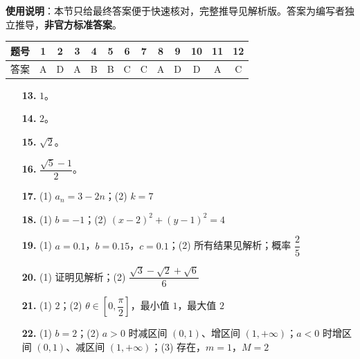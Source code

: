 
\begin{gknotice}
\textbf{使用说明}：本节只给最终答案便于快速核对，完整推导见解析版。答案为编写者独立推导，\textbf{非官方标准答案}。
\end{gknotice}

\begin{center}\begin{tabular}{ccccccccccccc}
\toprule
题号 & 1 & 2 & 3 & 4 & 5 & 6 & 7 & 8 & 9 & 10 & 11 & 12 \\
\midrule
答案 & A & D & A & B & B & C & C & A & D & D & A & C \\
\bottomrule
\end{tabular}\end{center}

\begin{itemize}[leftmargin=2.6em]
  \item[\textbf{13.}] $1$。
  \item[\textbf{14.}] $2$。
  \item[\textbf{15.}] $\sqrt2$。
  \item[\textbf{16.}] $\dfrac{\sqrt5-1}2$。
\end{itemize}

\begin{itemize}[leftmargin=2.6em]
  \item[\textbf{17.}] (1) $a_n=3-2n$；(2) $k=7$
  \item[\textbf{18.}] (1) $b=-1$；(2) $(x-2)^2+(y-1)^2=4$
  \item[\textbf{19.}] (1) $a=0.1$，$b=0.15$，$c=0.1$；(2) 所有结果见解析；概率 $\dfrac25$
  \item[\textbf{20.}] (1) 证明见解析；(2) $\dfrac{\sqrt3-\sqrt2+\sqrt6}6$
  \item[\textbf{21.}] (1) $2$；(2) $\theta\in\left[0,\dfrac\pi2\right]$，最小值 $1$，最大值 $2$
  \item[\textbf{22.}] (1) $b=2$；(2) $a>0$ 时减区间 $(0,1)$、增区间 $(1,+\infty)$；$a<0$ 时增区间 $(0,1)$、减区间 $(1,+\infty)$；(3) 存在，$m=1$，$M=2$
\end{itemize}
